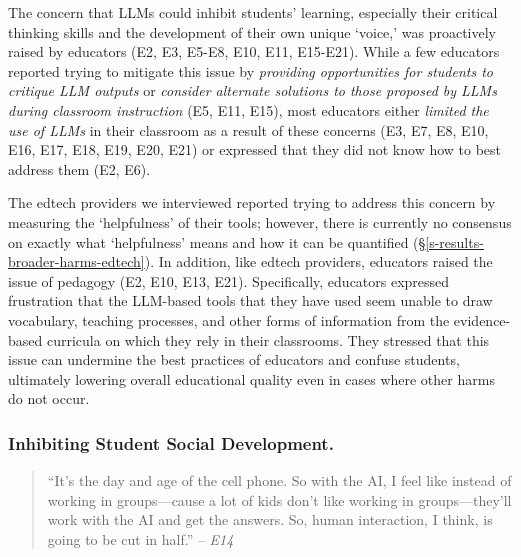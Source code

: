 \noindent The concern that LLMs could inhibit students' learning, especially their critical thinking skills and the development of their own unique `voice,' was proactively raised by educators (E2, E3, E5-E8, E10, E11, E15-E21). While a few educators reported trying to mitigate this issue by \textit{providing opportunities for students to critique LLM outputs} or \textit{consider alternate solutions to those proposed by LLMs during classroom instruction} (E5, E11, E15), most educators either \textit{limited the use of LLMs} in their classroom as a result of these concerns (E3, E7, E8, E10, E16, E17, E18, E19, E20, E21) or expressed that they did not know how to best address them (E2, E6). 

The edtech providers we interviewed reported trying to address this concern by measuring the `helpfulness' of their tools; however, there is currently no consensus on exactly what `helpfulness' means and how it can be quantified (\S\ref{s-results-broader-harms-edtech}). In addition, like edtech providers, educators raised the issue of pedagogy (E2, E10, E13, E21). Specifically, educators expressed frustration that the LLM-based tools that they have used seem unable to draw vocabulary, teaching processes, and other forms of information from the evidence-based curricula on which they rely in their classrooms. They stressed that this issue can undermine the best practices of educators and confuse students, ultimately lowering overall educational quality even in cases where other harms do not occur.


\subsubsection*{Inhibiting Student Social Development.}

\begin{quote}
    ``It’s the day and age of the cell phone. So with the AI, I feel like instead of working in groups---cause a lot of kids don't like working in groups---they’ll work with the AI and get the answers. So, human interaction, I think, is going to be cut in half.'' -- \textit{E14}
\end{quote}

